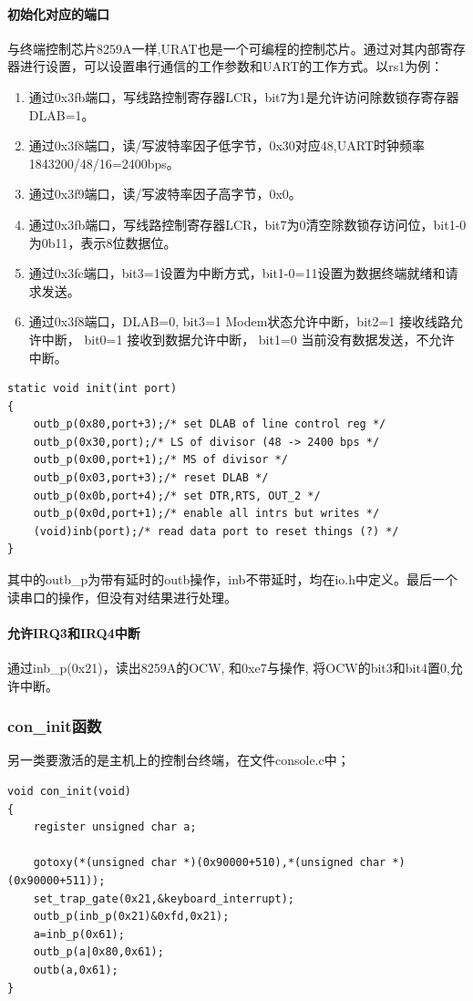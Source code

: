 \documentclass[12pt]{article}
\begin{document}
\paragraph{初始化对应的端口}
与终端控制芯片8259A一样,URAT也是一个可编程的控制芯片。通过对其内部寄存器进行设置，可以设置串行通信的工作参数和UART的工作方式。以rs1为例：
\begin{enumerate}
\item 通过0x3fb端口，写线路控制寄存器LCR，bit7为1是允许访问除数锁存寄存器DLAB=1。
\item 通过0x3f8端口，读/写波特率因子低字节，0x30对应48,UART时钟频率1843200/48/16=2400bps。
\item 通过0x3f9端口，读/写波特率因子高字节，0x0。
\item 通过0x3fb端口，写线路控制寄存器LCR，bit7为0清空除数锁存访问位，bit1-0为0b11，表示8位数据位。
\item 通过0x3fc端口，bit3=1设置为中断方式，bit1-0=11设置为数据终端就绪和请求发送。
\item 通过0x3f8端口，DLAB=0, bit3=1 Modem状态允许中断，bit2=1 接收线路允许中断， bit0=1 接收到数据允许中断， bit1=0 当前没有数据发送，不允许中断。
\end{enumerate}
\begin{lstlisting}[breaklines]
static void init(int port)
{
	outb_p(0x80,port+3);/* set DLAB of line control reg */
	outb_p(0x30,port);/* LS of divisor (48 -> 2400 bps */
	outb_p(0x00,port+1);/* MS of divisor */
	outb_p(0x03,port+3);/* reset DLAB */
	outb_p(0x0b,port+4);/* set DTR,RTS, OUT_2 */
	outb_p(0x0d,port+1);/* enable all intrs but writes */
	(void)inb(port);/* read data port to reset things (?) */
}
\end{lstlisting}
其中的outb\_p为带有延时的outb操作，inb不带延时，均在io.h中定义。最后一个读串口的操作，但没有对结果进行处理。
\paragraph{允许IRQ3和IRQ4中断}
通过inb\_p(0x21)，读出8259A的OCW, 和0xe7与操作, 将OCW的bit3和bit4置0,允许中断。

\subsubsection{con\_init函数}
另一类要激活的是主机上的控制台终端，在文件console.c中；
\begin{lstlisting}[breaklines]
void con_init(void)
{
	register unsigned char a;

	gotoxy(*(unsigned char *)(0x90000+510),*(unsigned char *)(0x90000+511));
	set_trap_gate(0x21,&keyboard_interrupt);
	outb_p(inb_p(0x21)&0xfd,0x21);
	a=inb_p(0x61);
	outb_p(a|0x80,0x61);
	outb(a,0x61);
}
\end{lstlisting}
\end{document}

